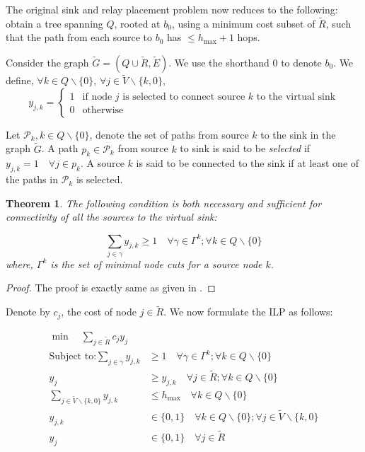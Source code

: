 \documentclass[conference]{IEEEtran}
\newcommand{\Gt}{\tilde{G}}
\newcommand{\Rt}{\tilde{R}}
\newcommand{\Vt}{\tilde{V}}
\newtheorem{theorem}{Theorem}
\begin{document}
The original sink and relay placement problem now reduces to the following: obtain a tree spanning $Q$, rooted at $b_0$, using a minimum cost subset of $\tilde{R}$, such that the path from each source to $b_0$ has $\leq h_{\max}+1$ hops. 

Consider the graph $\tilde{G} = (Q\cup \tilde{R}, \tilde{E})$. We use the shorthand $0$ to denote $b_0$. We define, $\forall k\in Q\backslash\{0\}$, $\forall j\in \tilde{V}\backslash\{k,0\}$,
\begin{equation*}
y_{j,k}=\left\{
\begin{array}{rl}
1 & \text{if node $j$ is selected to connect source $k$ to the virtual sink}\\
0 & \text{otherwise}
\end{array}\right.
\end{equation*}

Let $\mathcal{P}_k, k\in Q\backslash\{0\}$, denote the set of paths from source $k$ to the sink in the graph $\Gt$. A path $p_k\in \mathcal{P}_k$ from source $k$ to sink is said to be \emph{selected} if $y_{j,k}=1\quad\forall j\in p_k$. A source $k$ is said to be connected to the sink if at least one of the paths in $\mathcal{P}_k$ is selected.
 
\begin{theorem}
The following condition is both \emph{necessary and sufficient} for connectivity of all the sources to the virtual sink:

\begin{equation}
\sum_{j\in \gamma}y_{j,k}\geq 1\quad \forall \gamma\in\Gamma^k;\forall k\in Q\backslash\{0\}
\label{eqn:node-cut-ineq}
\end{equation}
where, $\Gamma^k$ is the set of minimal node cuts for a source node $k$.
\end{theorem}

\begin{proof}
The proof is exactly same as given in \cite{fullpaper}.
\end{proof}

Denote by $c_j$, the cost of node $j\in\Rt$. We now formulate the ILP as follows:

\begin{align}
\min \quad\sum_{j\in \Rt}c_jy_j\label{obj:ilp}\\
\text{Subject to:}\sum_{j\in \gamma}y_{j,k}&\geq 1\quad \forall \gamma\in\Gamma^k;\forall k\in Q\backslash\{0\}\label{constr:conn}\\
y_j &\geq y_{j,k}\quad \forall j\in \Rt;\forall k\in Q\backslash\{0\}\label{constr:nodeselect}\\
\sum_{j\in \Vt\backslash\{k,0\}}y_{j,k}&\leq h_{\max}\quad\forall k\in Q\backslash\{0\}\label{constr:hop}\\
y_{j,k}&\in \{0,1\}\quad \forall k\in Q\backslash\{0\};\forall j\in \Vt\backslash\{k,0\}\label{constr:int1}\\
y_j &\in \{0,1\}\quad \forall j\in \Rt\label{constr:int2} 
\end{align}
\end{document}
